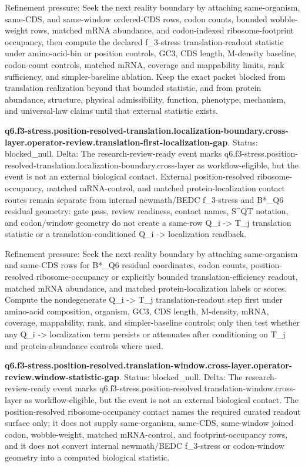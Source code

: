 Refinement pressure: Seek the next reality boundary by attaching same-organism, same-CDS, and same-window ordered-CDS rows, codon counts, bounded wobble-weight rows, matched mRNA abundance, and codon-indexed ribosome-footprint occupancy, then compute the declared f\_3-stress translation-readout statistic under amino-acid-bin or position controls, GC3, CDS length, M-density baseline, codon-count controls, matched mRNA, coverage and mappability limits, rank sufficiency, and simpler-baseline ablation. Keep the exact packet blocked from translation realization beyond that bounded statistic, and from protein abundance, structure, physical admissibility, function, phenotype, mechanism, and universal-law claims until that external statistic exists.

\textbf{q6.f3-stress.position-resolved-translation.localization-boundary.cross-layer.operator-review.translation-first-localization-gap}. Status: blocked\_null. Delta: The research-review-ready event marks q6.f3-stress.position-resolved-translation.localization-boundary.cross-layer as workflow-eligible, but the event is not an external biological contact. External position-resolved ribosome-occupancy, matched mRNA-control, and matched protein-localization contact routes remain separate from internal newmath/BEDC f\_3-stress and B*\_Q6 residual geometry: gate pass, review readiness, contact names, S\textasciicircum{}QT notation, and codon/window geometry do not create a same-row Q\_i -> T\_j translation statistic or a translation-conditioned Q\_i -> localization readback.

Refinement pressure: Seek the next reality boundary by attaching same-organism and same-CDS rows for B*\_Q6 residual coordinates, codon counts, position-resolved ribosome-occupancy or explicitly bounded translation-efficiency readout, matched mRNA abundance, and matched protein-localization labels or scores. Compute the nondegenerate Q\_i -> T\_j translation-readout step first under amino-acid composition, organism, GC3, CDS length, M-density, mRNA, coverage, mappability, rank, and simpler-baseline controls; only then test whether any Q\_i -> localization term persists or attenuates after conditioning on T\_j and protein-abundance controls where used.

\textbf{q6.f3-stress.position-resolved.translation-window.cross-layer.operator-review.window-statistic-gap}. Status: blocked\_null. Delta: The research-review-ready event marks q6.f3-stress.position-resolved.translation-window.cross-layer as workflow-eligible, but the event is not an external biological contact. The position-resolved ribosome-occupancy contact names the required curated readout surface only; it does not supply same-organism, same-CDS, same-window joined codon, wobble-weight, matched mRNA-control, and footprint-occupancy rows, and it does not convert internal newmath/BEDC f\_3-stress or codon-window geometry into a computed biological statistic.

